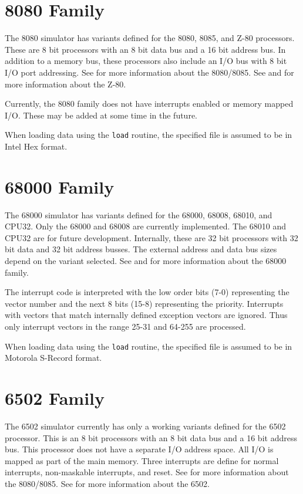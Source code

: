 \documentclass[10pt, openany]{book}
\newcommand{\function}[1]{\texttt{#1}}
\begin{document}
\section{8080 Family}
The 8080 simulator has variants defined for the 8080, 8085, and Z-80 processors.  These are 8 bit processors with an 8 bit data bus and a 16 bit address bus.  In addition to a memory bus, these processors also include an I/O bus with 8 bit I/O port addressing.  See \cite{i8080} for more information about the 8080/8085.  See \cite{z80} and \cite{z80undoc} for more information about the Z-80.

Currently, the 8080 family does not have interrupts enabled or memory mapped I/O.  These may be added at some time in the future.

When loading data using the \function{load} routine, the specified file is assumed to be in Intel Hex format.

\section{68000 Family}
The 68000 simulator has variants defined for the 68000, 68008, 68010, and CPU32.  Only the 68000 and 68008 are currently implemented.  The 68010 and CPU32 are for future development.  Internally, these are 32 bit processors with 32 bit data and 32 bit address busses.  The external address and data bus sizes depend on the variant selected.  See \cite{m68000a} and \cite{m68000b} for more information about the 68000 family.

The interrupt code is interpreted with the low order bits (7-0) representing the vector number and the next 8 bits (15-8) representing the priority.  Interrupts with vectors that match internally defined exception vectors are ignored.  Thus only interrupt vectors in the range 25-31 and 64-255 are processed.

When loading data using the \function{load} routine, the specified file is assumed to be in Motorola S-Record format.

\section{6502 Family}
The 6502 simulator currently has only a working variants defined for the 6502 processor.  This is an 8 bit processors with an 8 bit data bus and a 16 bit address bus.  This processor does not have a separate I/O address space.  All I/O is mapped as part of the main memory.  Three interrupts are define for normal interrupts, non-maskable interrupts, and reset.  See \cite{i8080} for more information about the 8080/8085.  See \cite{msc6502} for more information about the 6502.
\end{document}
